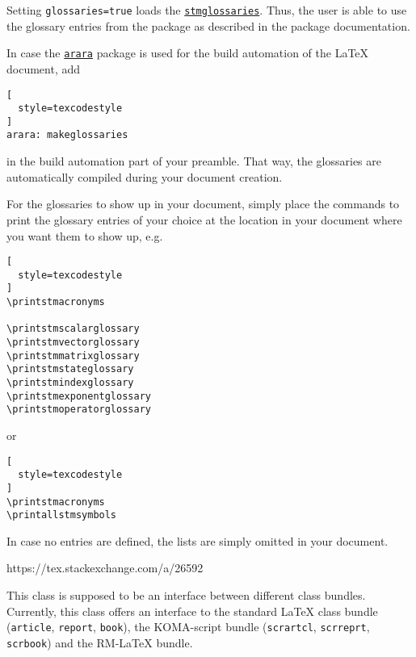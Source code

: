 \documentclass[%
  type=article,%
  layout=koma,%
  page=false,%
  cleveref=true,%
  conditionallox=true,%
  conditionalloxnewpage=true,%
  date=true,%
  glossaries=true,%
  hyperref=true,%
  index=true,%
  listings=true%
]{stmtext}
\newcommand{\stmlatexpackagelink}[1]{\href{https://github.com/raedma/stmlatex/blob/master/doc/#1/#1.pdf}{\texttt{#1}}}
\newcommand{\ctanpackagelink}[1]{\href{https://ctan.org/pkg/#1}{\texttt{#1}}}
\begin{document}
Setting \texttt{glossaries=true} loads the \stmlatexpackagelink{stmglossaries}. Thus, the user is able to use the glossary entries from the package as described in the package documentation.

In case the \ctanpackagelink{arara} package is used for the build automation of the \LaTeX{} document, add
\begin{lstlisting}[
  style=texcodestyle
]
arara: makeglossaries
\end{lstlisting}

in the build automation part of your preamble. That way, the glossaries are automatically compiled during your document creation.

For the glossaries to show up in your document, simply place the commands to print the glossary entries of your choice at the location in your document where you want them to show up, e.g.

\begin{lstlisting}[
  style=texcodestyle
]
\printstmacronyms

\printstmscalarglossary
\printstmvectorglossary
\printstmmatrixglossary
\printstmstateglossary
\printstmindexglossary
\printstmexponentglossary
\printstmoperatorglossary
\end{lstlisting}

or

\begin{lstlisting}[
  style=texcodestyle
]
\printstmacronyms
\printallstmsymbols
\end{lstlisting}

In case no entries are defined, the lists are simply omitted in your document.%



\label{sec:options:hyperref}

https://tex.stackexchange.com/a/26592


\label{sec:options:layout}

This class is supposed to be an interface between different class bundles. Currently, this class offers an interface to the standard \LaTeX{} class bundle (\texttt{article}, \texttt{report}, \texttt{book}), the KOMA-script bundle (\texttt{scrartcl}, \texttt{scrreprt}, \texttt{scrbook}) and the RM-\LaTeX{} bundle.
\end{document}
